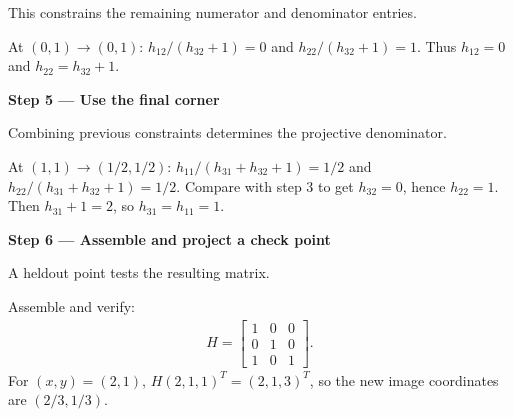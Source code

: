 \documentclass[letterpaper,11pt,english,openany,oneside]{jupyterBook}
\begin{document}
\sphinxAtStartPar
{} This constrains the remaining numerator and denominator entries.

\sphinxAtStartPar
At {\color{QuizMathBlue} \((0,1)\to(0,1)\)}: {\color{QuizMathBlue} \(h_{12}/(h_{32}+1)=0\)} and {\color{QuizMathBlue} \(h_{22}/(h_{32}+1)=1\)}. Thus {\color{QuizMathBlue} \(h_{12}=0\)} and {\color{QuizMathBlue} \(h_{22}=h_{32}+1\)}.

\par

\par\medskip{}
{\color{QuizStepRed}\bfseries Step 5 — Use the final corner}\par\smallskip

\sphinxAtStartPar
{} Combining previous constraints determines the projective denominator.

\sphinxAtStartPar
At {\color{QuizMathBlue} \((1,1)\to(1/2,1/2)\)}: {\color{QuizMathBlue} \(h_{11}/(h_{31}+h_{32}+1)=1/2\)} and {\color{QuizMathBlue} \(h_{22}/(h_{31}+h_{32}+1)=1/2\)}. Compare with step 3 to get {\color{QuizMathBlue} \(h_{32}=0\)}, hence {\color{QuizMathBlue} \(h_{22}=1\)}. Then {\color{QuizMathBlue} \(h_{31}+1=2\)}, so {\color{QuizMathBlue} \(h_{31}=h_{11}=1\)}.

\par

\par\medskip{}
{\color{QuizStepRed}\bfseries Step 6 — Assemble and project a check point}\par\smallskip

\sphinxAtStartPar
{} A held\sphinxhyphen{}out point tests the resulting matrix.

\sphinxAtStartPar
Assemble and verify:
{\color{QuizMathBlue} \begin{equation*}
\begin{split}
\boxed{H=\begin{bmatrix}1&0&0\\0&1&0\\1&0&1\end{bmatrix}}.
\end{split}
\end{equation*}}
\sphinxAtStartPar
For {\color{QuizMathBlue} \((x,y)=(2,1)\)}, {\color{QuizMathBlue} \(H(2,1,1)^T=(2,1,3)^T\)}, so the new image coordinates are {\color{QuizMathBlue} \((2/3,1/3)\)}.

\par
\end{document}
